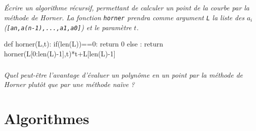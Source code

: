 \documentclass[10pt,fleqn]{article} %
\begin{document}
\subparagraph{}
\textit{Écrire un algorithme récursif, permettant de calculer un point de la courbe par la méthode de Horner. La fonction \texttt{horner} prendra comme argument \texttt{L} la liste des $a_i$ (\texttt{[an,a(n-1),...,a1,a0]}) et le paramètre $t$.}
\ifprof
\begin{corrige}
\begin{py}
\begin{python}
def horner(L,t):
    if(len(L))==0:
        return 0
    else : 
        return horner(L[0:len(L)-1],t)*t+L[len(L)-1]
\end{python}
\end{py}

\end{corrige}
\else
\fi

\subparagraph{}
\textit{Quel peut-être l'avantage d'évaluer un polynôme en un point par la méthode de Horner plutôt que par une méthode naïve ?}



\newpage


\section*{Algorithmes}
\end{document}
